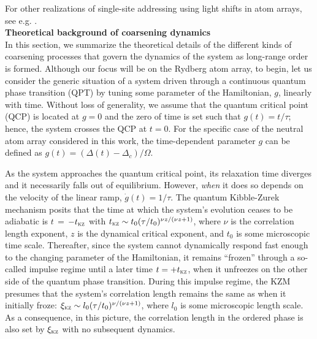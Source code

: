\documentclass[reprint,twocolumn,secnumarabic,amssymb, aps, prx]{revtex4-2}
\begin{document}
For other realizations of single-site addressing using light shifts in atom arrays, see e.g. \cite{chen2023continuous, de2024demonstration}.\\ 

\noindent\textbf{Theoretical background of coarsening dynamics}\\
In this section, we summarize the theoretical details of the different kinds of coarsening processes that govern the dynamics of the system as long-range order is formed. Although our focus will be on the Rydberg atom array, to begin, let us consider the generic situation of a  system driven through a continuous quantum phase transition (QPT) by tuning some parameter of the Hamiltonian, $g$,  linearly with time. Without loss of generality, we assume that the quantum critical point (QCP) is located at $g=0$ and the zero of time is set such that $g(t) = t/\tau$; hence, the system crosses the QCP at $t=0$. For the specific case of the neutral atom array considered in this work, the time-dependent parameter $g$ can be defined as $g (t) = (\Delta (t) - \Delta_c)/\Omega$.

As the system approaches the quantum critical point, its relaxation time diverges and it necessarily falls out of equilibrium. However, \textit{when} it does so depends on the velocity of the linear ramp, $\dot{g} (t) = 1/\tau$.
The quantum Kibble-Zurek mechanism posits that the time at which the system's evolution ceases to be adiabatic is $t$\,$=$\,$-t_{\textsc{kz}}$ with $t_{\textsc{kz}} \sim t_0(\tau/t_0)^{\nu z/(\nu z+1)}$, where $\nu$ is the correlation length exponent, $z$ is the dynamical critical exponent, and $t_0$ is some microscopic time scale. Thereafter, since the system cannot dynamically respond fast enough to the changing parameter of the Hamiltonian, it remains ``frozen'' through a so-called impulse regime until a later time $t=+t_{\textsc{kz}}$, when it unfreezes on the other side of the quantum phase transition. During this impulse regime, the KZM presumes that the system's correlation length remains the same as when it initially froze: $\xi_{\textsc{kz}} \sim l_0(\tau/t_0)^{\nu/(\nu z+1)}$, where $l_0$ is some microscopic length scale. As a consequence, in this picture, the correlation length in the ordered phase is also set by $\xi_{\textsc{kz}}$ with no subsequent dynamics.
\end{document}
